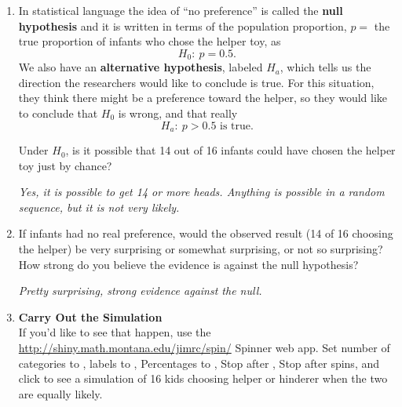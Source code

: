 \begin{enumerate}
\begin{key}
       {\it   That they are just picking one toy at random with no
         real preference for the helper or hinderer.}
\end{key}

   \item In statistical language the idea of ``no preference'' is
     called the {\bf null hypothesis}  and it is written in terms of
     the population proportion, $p=$ the true proportion of infants
     who chose the helper toy, as
      $$ H_0:\ p = 0.5.$$
     We also have an {\bf alternative hypothesis}, labeled $H_a$,
     which tells us the direction the researchers would like to
     conclude is true.  For this situation, they think there might be
     a preference toward the helper, so they would like to conclude
     that $H_0$ is wrong, and that really 
       $$H_a: \ p > 0.5 \mbox{ is true.}$$

     Under $H_0$,  is it possible that 14 out of 16
      infants could have chosen the helper toy just by chance? 
\begin{students}
  \vspace{1cm}
\end{students}

\begin{key}
{\it Yes, it is possible to get 14 or more heads. Anything is
  possible in a random sequence, but it is not very likely. }
\end{key}

\item If infants had no real preference, would the observed result (14
  of 16 choosing the helper) be very surprising or somewhat
  surprising, or not so surprising? How strong do you believe the
  evidence is against the null hypothesis?
\begin{students}
  \vspace{2cm}
\end{students}

\begin{key}
{\it Pretty surprising, strong evidence against the null.}
\end{key}


  \item         {\bf Carry Out the Simulation}\\
     If you'd like to see that happen, use the
       \url{http://shiny.math.montana.edu/jimrc/spin/} Spinner web app. Set
        number of categories to , labels to ,
        Percentages to , Stop after , Stop after  spins, and click  to
        see a simulation of 16 kids choosing helper or hinderer when
        the two are equally likely. 
\begin{students}
  \vspace{1.5cm}
\end{students}


\end{enumerate}
